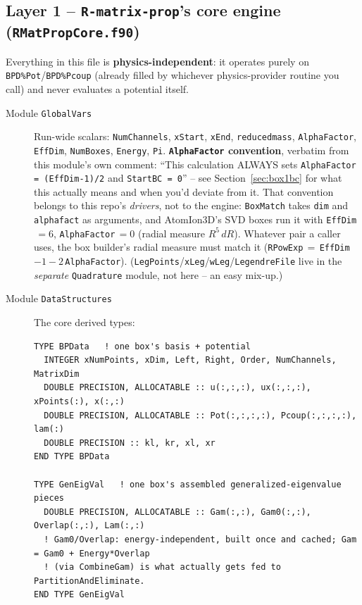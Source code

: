 \documentclass[11pt]{article}
\newcommand{\file}[1]{\texttt{#1}}
\newcommand{\sub}[1]{\texttt{#1}}
\begin{document}
\subsection{Layer 1 -- \texttt{R-matrix-prop}'s core engine (\file{RMatPropCore.f90})}

Everything in this file is \textbf{physics-independent}: it operates purely on
\texttt{BPD\%Pot}/\texttt{BPD\%Pcoup} (already filled by whichever physics-provider routine you
call) and never evaluates a potential itself.

\begin{description}
\item[Module \texttt{GlobalVars}] Run-wide scalars: \texttt{NumChannels}, \texttt{xStart},
  \texttt{xEnd}, \texttt{reducedmass}, \texttt{AlphaFactor}, \texttt{EffDim}, \texttt{NumBoxes},
  \texttt{Energy}, \texttt{Pi}. \textbf{\texttt{AlphaFactor} convention}, verbatim from this
  module's own comment: ``This calculation ALWAYS sets \texttt{AlphaFactor = (EffDim-1)/2} and
  \texttt{StartBC = 0}'' -- see Section~\ref{sec:box1bc} for what this actually means and when
  you'd deviate from it. That convention belongs to this repo's \emph{drivers}, not to the
  engine: \sub{BoxMatch} takes \texttt{dim} and \texttt{alphafact} as arguments, and AtomIon3D's
  SVD boxes run it with \texttt{EffDim}$\,=6$, \texttt{AlphaFactor}$\,=0$ (radial measure $R^5\,dR$).
  Whatever pair a caller uses, the box builder's radial measure must match it
  (\texttt{RPowExp}$\,=\,$\texttt{EffDim}$-1-2\,$\texttt{AlphaFactor}). (\texttt{LegPoints}/\texttt{xLeg}/\texttt{wLeg}/\texttt{LegendreFile}
  live in the \emph{separate} \texttt{Quadrature} module, not here -- an easy mix-up.)
\item[Module \texttt{DataStructures}] The core derived types:
\begin{lstlisting}
TYPE BPData   ! one box's basis + potential
  INTEGER xNumPoints, xDim, Left, Right, Order, NumChannels, MatrixDim
  DOUBLE PRECISION, ALLOCATABLE :: u(:,:,:), ux(:,:,:), xPoints(:), x(:,:)
  DOUBLE PRECISION, ALLOCATABLE :: Pot(:,:,:,:), Pcoup(:,:,:,:), lam(:)
  DOUBLE PRECISION :: kl, kr, xl, xr
END TYPE BPData

TYPE GenEigVal   ! one box's assembled generalized-eigenvalue pieces
  DOUBLE PRECISION, ALLOCATABLE :: Gam(:,:), Gam0(:,:), Overlap(:,:), Lam(:,:)
  ! Gam0/Overlap: energy-independent, built once and cached; Gam = Gam0 + Energy*Overlap
  ! (via CombineGam) is what actually gets fed to PartitionAndEliminate.
END TYPE GenEigVal


\end{lstlisting}
\end{description}
\end{document}
